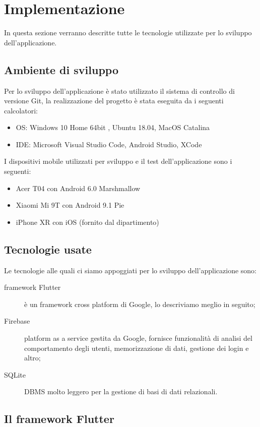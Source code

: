 \chapter{Implementazione\label{sec:implementazione}}
In questa sezione verranno descritte tutte le tecnologie utilizzate per lo sviluppo dell'applicazione.
\section{Ambiente di sviluppo\label{sec:ambiente}}
Per lo sviluppo dell'applicazione è stato utilizzato il sistema di controllo di versione Git,  la realizzazione del progetto è stata eseguita da i seguenti calcolatori:
\begin{itemize}
	\item OS: Windows 10 Home 64bit , Ubuntu 18.04, MacOS Catalina
	\item IDE: Microsoft Visual Studio Code, Android Studio, XCode
\end{itemize}

I dispositivi mobile utilizzati per sviluppo e il test dell'applicazione sono i seguenti:
\begin{itemize}
    \item Acer T04 con Android 6.0 Marshmallow
    \item Xiaomi Mi 9T con Android 9.1 Pie
    \item iPhone XR con iOS (fornito dal dipartimento)
\end{itemize}

\section{Tecnologie usate\label{sec:tecnologie}}
Le tecnologie alle quali ci siamo appoggiati per lo sviluppo dell'applicazione sono:
\begin{description}
    \item[framework Flutter] è un framework cross platform di Google, lo descriviamo meglio in seguito;
    \item[Firebase] platform as a service gestita da Google, fornisce funzionalità di analisi del comportamento degli utenti, memorizzazione di dati, gestione dei login e altro;
    \item[SQLite] DBMS molto leggero per la gestione di basi di dati relazionali.   
\end{description}


\section{Il framework Flutter\label{sec:flutter}}
